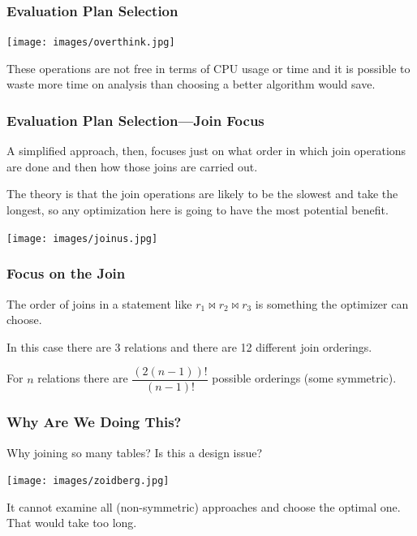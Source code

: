 \begin{frame}
\frametitle{Evaluation Plan Selection}


\begin{center}
	\texttt{[image: images/overthink.jpg]}
\end{center}

These operations are not free in terms of CPU usage or time and it is possible to waste more time on analysis than choosing a better algorithm would save. 

\end{frame}


\begin{frame}
\frametitle{Evaluation Plan Selection---Join Focus}

A simplified approach, then, focuses just on what order in which join operations are done and then how those joins are carried out. 

The theory is that the join operations are likely to be the slowest and take the longest, so any optimization here is going to have the most potential benefit.


\begin{center}
	\texttt{[image: images/joinus.jpg]}
\end{center}

\end{frame}

\begin{frame}
\frametitle{Focus on the Join}

The order of joins in a statement like $r_{1} \bowtie r_{2} \bowtie r_{3}$ is something the optimizer can choose. 

In this case there are 3 relations and there are 12 different join orderings. 

For $n$ relations there are $\dfrac{(2(n-1))!}{(n-1)!}$ possible orderings (some symmetric).


\end{frame}


\begin{frame}
\frametitle{Why Are We Doing This?}

Why joining so many tables? Is this a design issue?

\begin{center}
	\texttt{[image: images/zoidberg.jpg]}
\end{center}


It cannot examine all (non-symmetric) approaches and choose the optimal one. That would take too long.

\end{frame}


